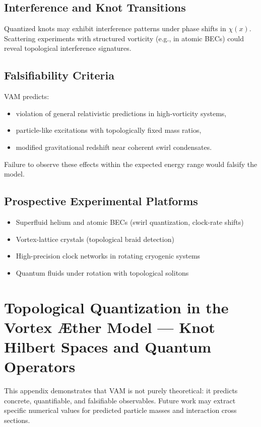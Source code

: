 \documentclass[a4paper,12pt]{article}
\begin{document}
        \subsection{Interference and Knot Transitions}
        Quantized knots may exhibit interference patterns under phase shifts in $\chi(x)$. Scattering experiments with structured vorticity (e.g., in atomic BECs) could reveal topological interference signatures.

        \subsection{Falsifiability Criteria}
        VAM predicts:
        \begin{itemize}
            \item violation of general relativistic predictions in high-vorticity systems,
            \item particle-like excitations with topologically fixed mass ratios,
            \item modified gravitational redshift near coherent swirl condensates.
        \end{itemize}
        Failure to observe these effects within the expected energy range would falsify the model.

        \subsection{Prospective Experimental Platforms}
        \begin{itemize}
            \item Superfluid helium and atomic BECs (swirl quantization, clock-rate shifts)
            \item Vortex-lattice crystals (topological braid detection)
            \item High-precision clock networks in rotating cryogenic systems
            \item Quantum fluids under rotation with topological solitons
        \end{itemize}


\section{Topological Quantization in the Vortex Æther Model — Knot Hilbert Spaces and Quantum Operators}
    This appendix demonstrates that VAM is not purely theoretical: it predicts concrete, quantifiable, and falsifiable observables. Future work may extract specific numerical values for predicted particle masses and interaction cross sections.
\end{document}
